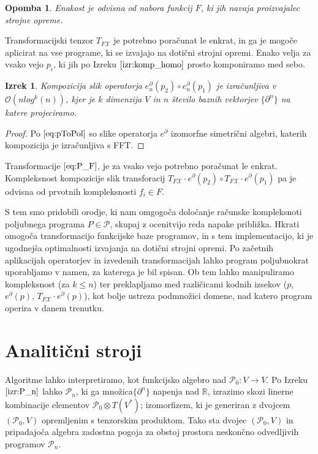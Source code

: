\documentclass{article}
\newcommand{\RR}{\mathbb{R}}
\newcommand{\X}{\mathcal{X}}
\newcommand{\dP}{\mathcal{P}}
\newcommand{\D}{\partial}
\newtheorem{izrek}{Izrek}[section]
\newtheorem{opomba}{Opomba}[section]
\begin{document}
\begin{opomba}
Enakost je odvisna od nabora funkcij $F$, ki jih navaja proizvajalec strojne opreme.
\end{opomba}

Transformacijski tenzor $T_{F\X}$ je potrebno poračunat le enkrat, in ga je mogoče aplicirat na vse programe, ki se izvajajo na dotični strojni opremi. Enako velja za vsako vejo $p_i$, ki jih po Izreku $\ref{izr:komp_homo}$ prosto komponiramo med sebo.

\begin{izrek}
Kompozicija slik operatorja $e_n^\D(p_2)\circ e_n^\D(p_1)$ je izračunljiva v $\mathcal{O}(nlog^k(n))$, kjer je $k$ dimenzija $V$ in $n$ število baznih vektorjev $\{\D^n\}$ na katere projeciramo.
\end{izrek}

\begin{proof}
	Po $\eqref{eq:pToPol}$ so slike operatorja $e^\D$ izomorfne simetrični algebri, katerih kompozicija je izračunljiva s FFT.
\end{proof}

Transformacije $\eqref{eq:P_F}$, je za vsako vejo potrebno poračunat le enkrat. Kompleksnost kompozicije slik transforacij $T_{F\X}\cdot e^\D(p_2)\circ T_{F\X}\cdot e^\D(p_1)$ pa je odvisna od prvotnih kompleksnosti $f_i\in F$.

S tem smo pridobili orodje, ki nam omgogoča določanje računske kompleksnoti poljubnega programa $P\in\dP$, skupaj z ocenitvijo reda napake približka. Hkrati omogoča transformacijo funkcijske baze programov, in s tem implementacijo, ki je ugodnejša optimalnosti izvajanja na dotični strojni opremi. Po začetnih aplikacijah operatorjev in izvedenih transformacijah lahko program poljubnokrat uporabljamo v namen, za katerega je bil spisan. Ob tem lahko manipuliramo kompleksnost (za $k\le n$) ter preklapljamo med različicami kodnih izsekov ($p$, $e^\D(p)$, $T_{F\X}\cdot e^\D(p)$), kot bolje ustreza podmnožici domene, nad katero program operira v danem trenutku.

\section{Analitični stroji}
Algoritme lahko interpretiramo, kot funkcijsko algebro nad $\dP_0:V\to V$. 
Po Izreku $\ref{izr:P_n}$ lahko $\dP_n$, ki ga množica$\{\D^n\}$ napenja nad $\RR$, izrazimo skozi linerne kombinacije elementov $\dP_0\otimes T(V^*)$; izomorfizem, ki je generiran z dvojcem $(\dP_0,V)$ opremljenim s tenzorskim produktom. Tako sta dvojec $(\dP_0,V)$ in pripadajoča algebra zadostna pogoja za obstoj prostora neskončno odvedljivih programov $\dP_n$.
\end{document}
